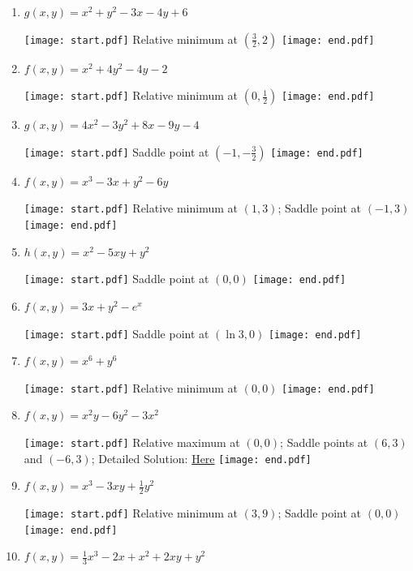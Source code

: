 \documentclass[12pt]{article}
\begin{document}
\begin{enumerate}

\item $g(x,y)=x^2+y^2-3x-4y+6$ 

\texttt{[image: start.pdf]}
{{Relative minimum at $\left(\frac{3}{2},2\right)$ }}
\texttt{[image: end.pdf]}


\item $f(x,y)=x^2+4y^2-4y-2$ 

\texttt{[image: start.pdf]}
{{Relative minimum at $\left(0,\frac{1}{2}\right)$}}
\texttt{[image: end.pdf]}


\item $g(x,y)=4x^2-3y^2+8x-9y-4$ 

\texttt{[image: start.pdf]}
{{Saddle point at $\left(-1,-\frac{3}{2}\right)$}}
\texttt{[image: end.pdf]}


\item $f(x,y)=x^3-3x+y^2-6y$

\texttt{[image: start.pdf]}
{{Relative minimum at $(1,3)$; Saddle point at $(-1,3)$}}
\texttt{[image: end.pdf]}


\item $h(x,y)=x^2-5xy+y^2$ 

\texttt{[image: start.pdf]}
{{Saddle point at $(0,0)$}}
\texttt{[image: end.pdf]}


\item $f(x,y)=3x+y^2-e^x$

\texttt{[image: start.pdf]}
{{Saddle point at $(\ln{3},0)$}}
\texttt{[image: end.pdf]}


\item $f(x,y)=x^6+y^6$

\texttt{[image: start.pdf]}
{{Relative minimum at $(0,0)$}}
\texttt{[image: end.pdf]}


\item $f(x,y)=x^2y-6y^2-3x^2$

\texttt{[image: start.pdf]}
{{Relative maximum at $(0,0)$; Saddle points at $(6,3)$ and $(-6,3)$; Detailed Solution: \textcolor{blue}{\href{http://www.math.drexel.edu/classes/Calculus/resources/Math200HW/Solutions/15_200_Extrema_08.pdf}{Here}}}}
\texttt{[image: end.pdf]}


\item $f(x,y)=x^3-3xy+\frac{1}{2}y^2$

\texttt{[image: start.pdf]}
{{Relative minimum at $(3,9)$; Saddle point at $(0,0)$}}
\texttt{[image: end.pdf]}


\item $f(x,y)=\frac{1}{3}x^3-2x+x^2+2xy+y^2$


\end{enumerate}
\end{document}
